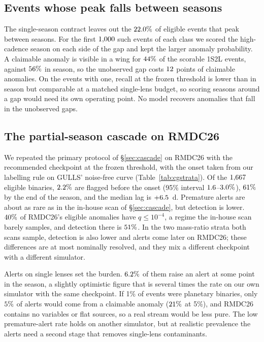\documentclass[twocolumn,linenumbers,floatfix,twocolappendix]{aastex701}
\begin{document}
\subsection{Events whose peak falls between seasons}\label{sec:gulls:seasons}

The single-season contract leaves out the $22.0\%$ of eligible events that peak between seasons. For
the first $1{,}000$ such events of each class we scored the high-cadence season on each side of the gap and kept the
larger anomaly probability. A claimable anomaly is visible in a wing for $44\%$ of the scorable 1S2L
events, against $56\%$ in season, so the unobserved gap costs $12$ points of claimable
anomalies. On the events with one, recall at the frozen threshold is lower than in season but comparable at a matched
single-lens budget, so scoring seasons around a gap would need its own operating point. No model recovers anomalies that fall in the
unobserved gaps.

\subsection{The partial-season cascade on RMDC26}\label{sec:gulls:cascade}

We repeated the primary protocol of \S\ref{sec:cascade} on RMDC26 with the recommended checkpoint at the frozen
threshold, with the onset taken from our labelling rule on GULLS' noise-free curve (Table~\ref{tab:cgstrata}). Of the $1{,}667$
eligible binaries, $2.2\%$ are flagged before the onset (95\% interval $1.6$--$3.0\%$),
$61\%$ by the end of the season, and the median lag is $+6.5$~d. Premature alerts are about as rare as in
the in-house scan of \S\ref{sec:cascade}, but detection is lower. $40\%$ of RMDC26's eligible
anomalies have $q \le 10^{-4}$, a regime the in-house scan barely samples, and detection there is
$51\%$. In the two mass-ratio strata both scans sample, detection is also lower and alerts come later
on RMDC26; these differences are at most nominally resolved, and they mix a different checkpoint with a different
simulator.

Alerts on single lenses set the burden. $6.2\%$ of them raise an alert at some point in the season, a
slightly optimistic figure that is several times the rate on our own simulator with the same checkpoint. If 1\% of
events were planetary binaries, only $5\%$ of alerts would come from a claimable anomaly ($21\%$
at 5\%), and RMDC26 contains no variables or flat sources, so a real stream would be less pure. The low premature-alert
rate holds on another simulator, but at realistic prevalence the alerts need a second stage that removes single-lens
contaminants.
\end{document}
